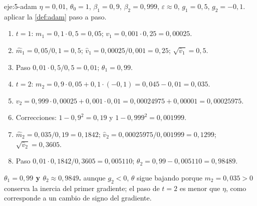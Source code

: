 \begin{solucion}{eje:5-adam}
\datos $\eta=0{,}01$, $\theta_0=1$, $\beta_1=0{,}9$, $\beta_2=0{,}999$, $\varepsilon\approx 0$, $g_1=0{,}5$, $g_2=-0{,}1$.
\planteamiento aplicar la \cref{def:adam} paso a paso.
\pasos
\begin{enumerate}[label=\arabic*.]
  \item $t=1$: $m_1=0{,}1\cdot 0{,}5=0{,}05$; $v_1=0{,}001\cdot 0{,}25=0{,}00025$.
  \item $\hat m_1=0{,}05/0{,}1=0{,}5$; $\hat v_1=0{,}00025/0{,}001=0{,}25$; $\sqrt{\hat v_1}=0{,}5$.
  \item Paso $0{,}01\cdot 0{,}5/0{,}5=0{,}01$; $\theta_1=0{,}99$.
  \item $t=2$: $m_2=0{,}9\cdot 0{,}05+0{,}1\cdot(-0{,}1)=0{,}045-0{,}01=0{,}035$.
  \item $v_2=0{,}999\cdot 0{,}00025+0{,}001\cdot 0{,}01=0{,}00024975+0{,}00001=0{,}00025975$.
  \item Correcciones: $1-0{,}9^{2}=0{,}19$ y $1-0{,}999^{2}=0{,}001999$.
  \item $\hat m_2=0{,}035/0{,}19=0{,}1842$; $\hat v_2=0{,}00025975/0{,}001999=0{,}1299$; $\sqrt{\hat v_2}=0{,}3605$.
  \item Paso $0{,}01\cdot 0{,}1842/0{,}3605=0{,}005110$; $\theta_2=0{,}99-0{,}005110=0{,}98489$.
\end{enumerate}
\resultado \textbf{$\theta_1=0{,}99$ y $\theta_2\approx 0{,}9849$.}
\comprobacion aunque $g_2<0$, $\theta$ sigue bajando porque $m_2=0{,}035>0$ conserva la inercia del primer gradiente; el paso de $t=2$ es menor que $\eta$, como corresponde a un cambio de signo del gradiente.
\end{solucion}

